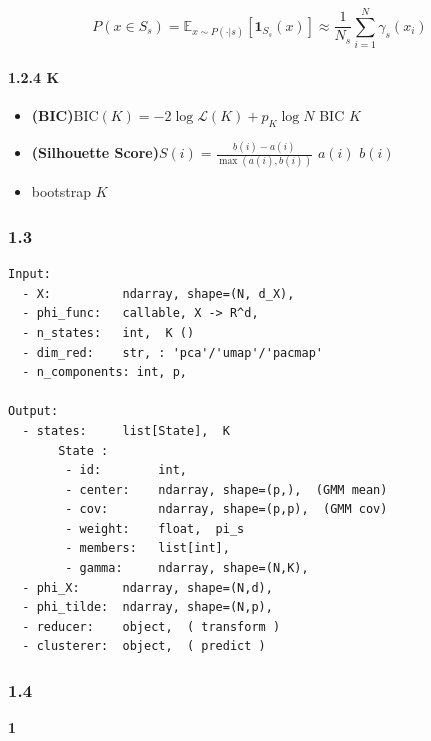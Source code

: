 \documentclass[
  12pt,
]{article}
\providecommand{\tightlist}{%
  \setlength{\itemsep}{0pt}\setlength{\parskip}{0pt}}
\begin{document}
\textbf{}

\[
P(x \in S_s) = \mathbb{E}_{x \sim P(\cdot|s)}[\mathbf{1}_{S_s}(x)] \approx \frac{1}{N_s} \sum_{i=1}^{N} \gamma_s(x_i)
\]

\paragraph{1.2.4  K
}\label{ux6700ux4f18ux72b6ux6001ux6570-k-ux7684ux9009ux62e9}

\begin{itemize}
\tightlist
\item
  \textbf{
  (BIC)}\(\text{BIC}(K) = -2 \log \mathcal{L}(K) + p_K \log N\)
  BIC  \(K\)
\item
  \textbf{ (Silhouette
  Score)}\(S(i) = \frac{b(i) - a(i)}{\max(a(i), b(i))}\)
  \(a(i)\) \(b(i)\) 
\item
  \textbf{} bootstrap
   \(K\)
\end{itemize}

\subsubsection{1.3
}\label{ux8f93ux5165ux8f93ux51faux89c4ux8303}

\begin{verbatim}
Input:
  - X:          ndarray, shape=(N, d_X), 
  - phi_func:   callable, X -> R^d, 
  - n_states:   int,  K ()
  - dim_red:    str, : 'pca'/'umap'/'pacmap'
  - n_components: int, p, 

Output:
  - states:     list[State],  K 
       State :
        - id:        int, 
        - center:    ndarray, shape=(p,),  (GMM mean)
        - cov:       ndarray, shape=(p,p),  (GMM cov)
        - weight:    float,  pi_s
        - members:   list[int], 
        - gamma:     ndarray, shape=(N,K), 
  - phi_X:      ndarray, shape=(N,d), 
  - phi_tilde:  ndarray, shape=(N,p), 
  - reducer:    object,  ( transform )
  - clusterer:  object,  ( predict )
\end{verbatim}

\subsubsection{1.4 }\label{ux5b9eux73b0ux65b9ux6cd5}

\textbf{ 1}
\end{document}
